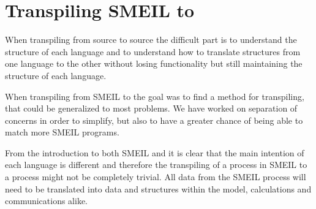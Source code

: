 


\section{Transpiling SMEIL to \cspm{}} \label{sec:transpiling}
When transpiling from source to source the difficult part is to understand the structure of each language and to understand how to translate structures from one language to the other without losing functionality but still maintaining the structure of each language.

When transpiling from SMEIL to \cspm{} the goal was to find a method for transpiling, that could be generalized to most problems. We have worked on separation of concerns in order to simplify, but also to have a greater chance of being able to match more SMEIL programs.

From the introduction to both SMEIL and \cspm it is clear that the main intention of each language is different and therefore the transpiling of a process in SMEIL to a \cspm process might not be completely trivial. All data from the SMEIL process will need to be translated into data and structures within the \cspm model, calculations and communications alike.







